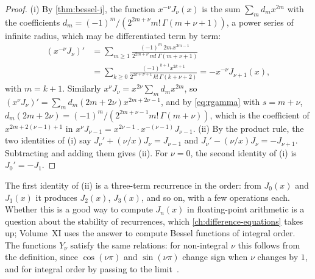 \begin{proof}
(i) By \cref{thm:bessel-j}, the function $x^{-\nu}J_\nu(x)$ is the sum $\sum_md_mx^{2m}$ with the coefficients $d_m=(-1)^m/(2^{2m+\nu}m!\,\Gamma(m+\nu+1))$, a power series of infinite radius, which may be differentiated term by term:
\begin{align*}
(x^{-\nu}J_\nu)'&=\sum_{m\ge1}\frac{(-1)^m\,2m\,x^{2m-1}}{2^{2m+\nu}\,m!\,\Gamma(m+\nu+1)}\\
&=\sum_{k\ge0}\frac{(-1)^{k+1}x^{2k+1}}{2^{2k+\nu+1}\,k!\,\Gamma(k+\nu+2)}=-x^{-\nu}J_{\nu+1}(x),
\end{align*}
with $m=k+1$. Similarly $x^\nu J_\nu=x^{2\nu}\sum_md_mx^{2m}$, so $(x^\nu J_\nu)'=\sum_md_m(2m+2\nu)x^{2m+2\nu-1}$, and by \eqref{eq:rgamma} with $s=m+\nu$, $d_m(2m+2\nu)=(-1)^m/(2^{2m+\nu-1}m!\,\Gamma(m+\nu))$, which is the coefficient of $x^{2m+2(\nu-1)+1}$ in $x^{\nu}J_{\nu-1}=x^{2\nu-1}\cdot x^{-(\nu-1)}J_{\nu-1}$. (ii) By the product rule, the two identities of (i) say $J_\nu'+(\nu/x)J_\nu=J_{\nu-1}$ and $J_\nu'-(\nu/x)J_\nu=-J_{\nu+1}$. Subtracting and adding them gives (ii). For $\nu=0$, the second identity of (i) is $J_0'=-J_1$.
\end{proof}

The first identity of (ii) is a three-term recurrence in the order: from $J_0(x)$ and $J_1(x)$ it produces $J_2(x)$, $J_3(x)$, and so on, with a few operations each. Whether this is a good way to compute $J_n(x)$ in floating-point arithmetic is a question about the stability of recurrences, which \cref{ch:difference-equations} takes up; Volume~XI uses the answer to compute Bessel functions of integral order. The functions $Y_\nu$ satisfy the same relations: for non-integral $\nu$ this follows from the definition, since $\cos(\nu\pi)$ and $\sin(\nu\pi)$ change sign when $\nu$ changes by $1$, and for integral order by passing to the limit~\cite[Chap.~III]{watson1944}.

